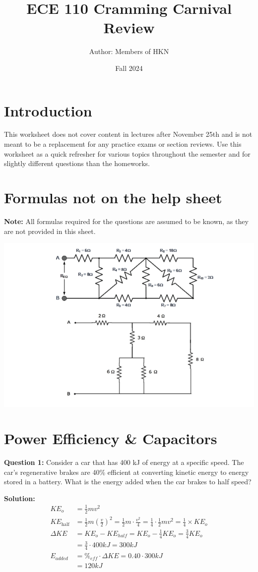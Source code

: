 \documentclass{article}
\begin{document}
\title{ECE 110 Cramming Carnival Review}
\author{Author: Members of HKN}
\date{Fall 2024}
\maketitle

\section*{Introduction}
This worksheet does not cover content in lectures after November 25th and is not meant to be a replacement for any practice exams or section reviews. Use this worksheet as a quick refresher for various topics throughout the semester and for slightly different questions than the homeworks.

\section*{Formulas not on the help sheet}
\textbf{Note:} All formulas required for the questions are assumed to be known, as they are not provided in this sheet.
\begin{center}
    \includegraphics[width=0.75\linewidth]{figures/image.png}
\end{center}
\newpage

\section*{Power Efficiency \& Capacitors}
\textbf{Question 1:} Consider a car that has 400 kJ of energy at a specific speed. The car's regenerative brakes are 40\% efficient at converting kinetic energy to energy stored in a battery. What is the energy added when the car brakes to half speed?

\textbf{Solution:}
\begin{align*}
    KE_{o} &= \frac{1}{2}mv^{2} \\
    KE_{\text{half}} &= \frac{1}{2} m {\left( \frac{v}{2} \right)}^{2}  = \frac{1}{2} m \cdot \frac{v^{2}}{4}  = \frac{1}{4} \cdot \frac{1}{2} m v^{2} =  \frac{1}{4} \times KE_{o} \\
    \Delta KE &= KE_{o} - KE_{half} = KE_{o} - \frac{1}{4}KE_{o} = \frac{3}{4}KE_{o} \\
    &= \frac{3}{4} \cdot 400kJ = 300 kJ \\
    E_{added} &= \%_{eff} \cdot \Delta KE = 0.40 \cdot 300kJ \\
    &= \boxed{120kJ}
\end{align*}
\end{document}
